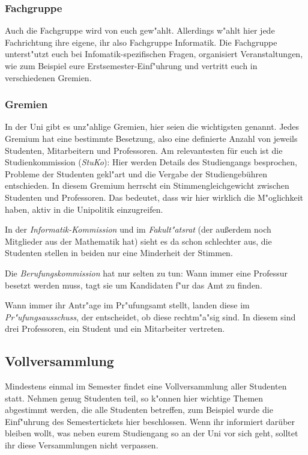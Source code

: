 \subsubsection*{Fachgruppe}
Auch die Fachgruppe wird von euch gew"ahlt.
Allerdings w"ahlt hier jede Fachrichtung ihre eigene, ihr also Fachgruppe Informatik.
Die Fachgruppe unterst"utzt euch bei Infomatik-spezifischen Fragen, organisiert Veranstaltungen, wie zum Beispiel eure Erstsemester-Einf"uhrung und vertritt euch in verschiedenen Gremien.
\subsubsection*{Gremien}
In der Uni gibt es unz"ahlige Gremien, hier seien die wichtigsten genannt.
Jedes Gremium hat eine bestimmte Besetzung, also eine definierte Anzahl von jeweils Studenten, Mitarbeitern und Professoren.
Am relevantesten für euch ist die Studienkommission (\emph{StuKo}):
Hier werden Details des Studiengangs besprochen, Probleme der Studenten gekl"art und die Vergabe der Studiengebühren entschieden.
In diesem Gremium herrscht ein Stimmengleichgewicht zwischen Studenten und Professoren.
Das bedeutet, dass wir hier wirklich die M"oglichkeit haben, aktiv in die Unipolitik einzugreifen.

In der \emph{Informatik-Kommission} und im \emph{Fakult"atsrat} (der außerdem noch Mitglieder aus der Mathematik hat) sieht es da schon schlechter aus, die Studenten stellen in beiden nur eine Minderheit der Stimmen.

Die \emph{Berufungskommission} hat nur selten zu tun:
Wann immer eine Professur besetzt werden muss, tagt sie um Kandidaten f"ur das Amt zu finden.

Wann immer ihr Antr"age im Pr"ufungsamt stellt, landen diese im \emph{Pr"ufungsausschuss}, der entscheidet, ob diese rechtm"a"sig sind.
In diesem sind drei Professoren, ein Student und ein Mitarbeiter vertreten.

\subsection*{Vollversammlung}
Mindestens einmal im Semester findet eine Vollversammlung aller Studenten statt.
Nehmen genug Studenten teil, so k"onnen hier wichtige Themen abgestimmt werden, die alle Studenten betreffen, zum Beispiel wurde die Einf"uhrung des Semestertickets hier beschlossen.
Wenn ihr informiert darüber bleiben wollt, was neben eurem Studiengang so an der Uni vor sich geht, solltet ihr diese Versammlungen nicht verpassen.